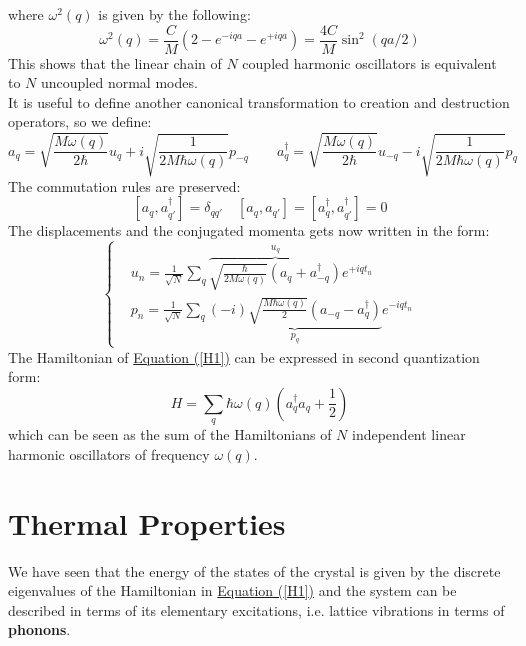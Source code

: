 \documentclass[10.75pt,a4paper,openright,bottom=2cm]{article}
\begin{document}
where $\omega^2(q)$ is given by the following:
\[
\omega^2(q)=\frac{C}{M}(2-e^{-iqa}-e^{+iqa})=\frac{4C}{M}\sin^2(qa/2)
\]
This shows that the linear chain of $N$ coupled harmonic oscillators is equivalent to $N$ uncoupled normal modes.\\
It is useful to define another canonical transformation to creation and destruction operators, so we define:
\[
a_q=\sqrt{\frac{M\omega(q)}{2\hbar}}u_q+i\sqrt{\frac{1}{2M\hbar\omega(q)}}p_{-q} \qquad a_q^\dagger=\sqrt{\frac{M\omega(q)}{2\hbar}}u_{-q}-i\sqrt{\frac{1}{2M\hbar\omega(q)}}p_q
\]
The commutation rules are preserved:
\[
[a_q,a_{q'}^\dagger]=\delta_{qq'} \quad [a_q,a_{q'}]=[a_q^\dagger,a_{q'}^\dagger]=0
\]
The displacements and the conjugated momenta gets now written in the form:
\[
\left\{
\begin{aligned}
&u_n=\frac{1}{\sqrt{N}}\sum_q\overbrace{\sqrt{\frac{\hbar}{2M\omega(q)}}(a_q+a_{-q}^\dagger)}^{u_q}e^{+iqt_n}\\
&p_n=\frac{1}{\sqrt{N}}\sum_q\underbrace{(-i)\sqrt{\frac{M\hbar\omega(q)}{2}}(a_{-q}-a_q^\dagger)}_{p_q}e^{-iqt_n}
\end{aligned}
\right.
\]
The Hamiltonian of \hyperref[H1]{Equation (\ref{H1})} can be expressed in second quantization form:
\[
H=\sum_q\hbar\omega(q)\left(a_q^\dagger a_q+\frac{1}{2}\right)
\]
which can be seen as the sum of the Hamiltonians of $N$ independent linear harmonic oscillators of frequency $\omega(q)$.
\newpage
\section{Thermal Properties}
We have seen that the energy of the states of the crystal is given by the discrete eigenvalues of the Hamiltonian in \hyperref[H1]{Equation (\ref{H1})} and the system can be described in terms of its elementary excitations, i.e. lattice vibrations in terms of \textbf{phonons}.
\end{document}
